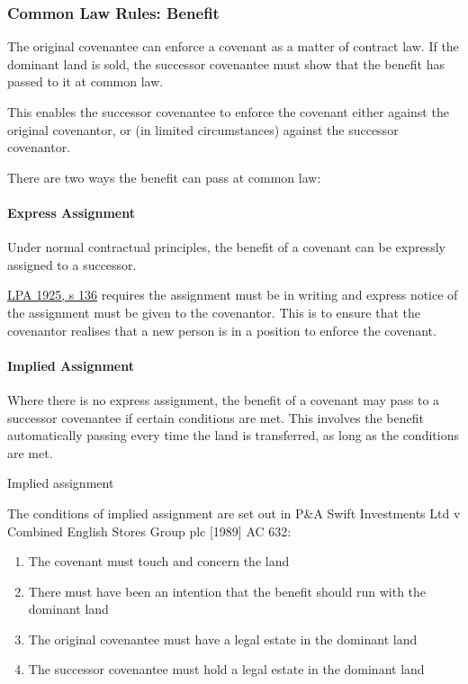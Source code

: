 \documentclass[
]{article}
\providecommand{\tightlist}{%
  \setlength{\itemsep}{0pt}\setlength{\parskip}{0pt}}
\newenvironment{env-9a1d7316-f242-42ab-b216-19df5e12c935}
{
    \savenotes\tcolorbox[blanker,breakable,left=5pt,borderline west={2pt}{-4pt}{pink}]
}
{
    \endtcolorbox\spewnotes
}
\begin{document}
\hypertarget{common-law-rules-benefit}{%
\subsubsection{Common Law Rules:
Benefit}\label{common-law-rules-benefit}}

The original covenantee can enforce a covenant as a matter of contract
law. If the dominant land is sold, the successor covenantee must show
that the benefit has passed to it at common law.

This enables the successor covenantee to enforce the covenant either
against the original covenantor, or (in limited circumstances) against
the successor covenantor.

There are two ways the benefit can pass at common law:

\hypertarget{express-assignment}{%
\paragraph{Express Assignment}\label{express-assignment}}

Under normal contractual principles, the benefit of a covenant can be
expressly assigned to a successor.

\href{https://www.legislation.gov.uk/ukpga/Geo5/15-16/20/section/136}{LPA
1925, s 136} requires the assignment must be in writing and express
notice of the assignment must be given to the covenantor. This is to
ensure that the covenantor realises that a new person is in a position
to enforce the covenant.

\hypertarget{implied-assignment}{%
\paragraph{Implied Assignment}\label{implied-assignment}}

Where there is no express assignment, the benefit of a covenant may pass
to a successor covenantee if certain conditions are met. This involves
the benefit automatically passing every time the land is transferred, as
long as the conditions are met.

\begin{env-9a1d7316-f242-42ab-b216-19df5e12c935}

Implied assignment

The conditions of implied assignment are set out in P\&A Swift
Investments Ltd v Combined English Stores Group plc {[}1989{]} AC 632:

\begin{enumerate}
\tightlist
\item
  The covenant must touch and concern the land
\item
  There must have been an intention that the benefit should run with the
  dominant land
\item
  The original covenantee must have a legal estate in the dominant land
\item
  The successor covenantee must hold a legal estate in the dominant land
\end{enumerate}

\end{env-9a1d7316-f242-42ab-b216-19df5e12c935}
\end{document}
